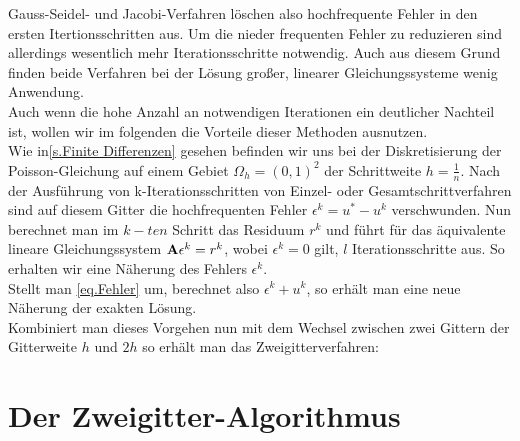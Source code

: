 Gauss-Seidel- und Jacobi-Verfahren löschen also hochfrequente Fehler in den ersten Itertionsschritten aus. Um die nieder frequenten Fehler zu reduzieren sind allerdings wesentlich mehr Iterationsschritte notwendig. Auch aus diesem Grund finden beide Verfahren bei der Lösung großer, linearer Gleichungssysteme wenig Anwendung. \\
Auch wenn die hohe Anzahl an notwendigen Iterationen ein deutlicher Nachteil ist, wollen wir im folgenden die Vorteile dieser Methoden ausnutzen. \\%
Wie in\autoref{s.Finite Differenzen} gesehen befinden wir uns bei der Diskretisierung der Poisson-Gleichung auf einem Gebiet $\Omega_{h} = (0,1)^{2}$ der Schrittweite $h = \frac {1} {n}$. Nach der Ausführung von k-Iterationsschritten von Einzel- oder Gesamtschrittverfahren sind auf diesem Gitter die hochfrequenten Fehler $\epsilon^{k} = u^{*} - u^{k}$ verschwunden. Nun berechnet man im $k-ten$ Schritt das Residuum $r^{k}$ und führt für das äquivalente lineare Gleichungssystem ${\textbf{A}}\epsilon^{k} = r^{k}$, wobei $\epsilon^{k} = 0$ gilt, $l$ Iterationsschritte aus. So erhalten wir eine Näherung des Fehlers $\epsilon^{k}$. \\
Stellt man \autoref{eq.Fehler} um, berechnet also $\epsilon^{k} + u^{k}$, so erhält man eine neue Näherung der exakten Lösung. \\
Kombiniert man dieses Vorgehen nun mit dem Wechsel zwischen zwei Gittern der Gitterweite $h$ und $2h$ so erhält man das Zweigitterverfahren:

\section{Der Zweigitter-Algorithmus}\label{s.Der Zweigitter-Algorithmus}

